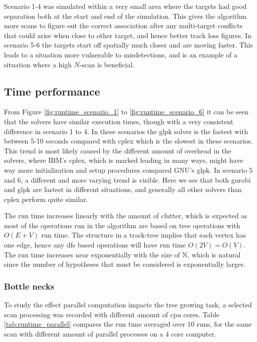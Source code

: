 Scenario 1-4 was simulated within a very small area where the targets had good separation both at the start and end of the simulation. This gives the algorithm more \glspl{scan} to figure out the correct association after any multi-target conflicts that could arise when close to other target, and hence better track loss figures. In scenario 5-6 the targets start off spatially much closer and are moving faster. This leads to a situation more vulnerable to misdetections, and is an example of a situation where a high $N$-scan is beneficial.

\subsection{Time performance}
From Figure \ref{fig:runtime_scenario_1} to \ref{fig:runtime_scenario_6} it can be seen that the solvers have similar execution times, though with a very consistent difference in scenario 1 to 4. In these scenarios the \gls{glpk} solver is the fastest with between 5-10 seconds compared with \gls{cplex} which is the slowest in these scenarios. This trend is most likely caused by the different amount of overhead in the solvers, where IBM's \gls{cplex}, which is marked leading in many ways, might have way more initialization and setup procedures compared GNU's \gls{glpk}. In scenario 5 and 6, a different and more varying trend is visible. Here we see that both \gls{gurobi} and \gls{glpk} are fastest in different situations, and generally all other solvers than \gls{cplex} perform quite similar.

The run time increases linearly with the amount of clutter, which is expected as most of the operations run in the algorithm are based on tree operations with $O(E+V)$ run time. The structure in a track-tree implies that each vertex has one edge, hence any \gls{dfs} based operations will have run time  $O(2V)=O(V)$. The run time increases near exponentially with the size of N, which is natural since the number of hypotheses that must be considered is exponentially larger.

\subsubsection{Bottle necks}
To study the effect parallel computation impacts the tree growing task, a selected scan processing was recorded with different amount of \gls{cpu} cores. Table \ref{tab:runtime_parallel} compares the run time averaged over 10 runs, for the same scan with different amount of parallel processes on a 4 core computer.

